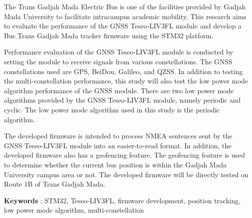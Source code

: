 The Trans Gadjah Mada Electric Bus is one of the facilities provided by Gadjah Mada University to facilitate intracampus academic mobility. This research aims to evaluate the performance of the GNSS Teseo-LIV3FL module and develop a Bus Trans Gadjah Mada tracker firmware using the STM32 platform.

Performance evaluation of the GNSS Teseo-LIV3FL module is conducted by setting the module to receive signals from various constellations. The GNSS constellations used are GPS, BeiDou, Galileo, and QZSS. In addition to testing the multi-constellation performance, this study will also test the low power mode algorithm performance of the GNSS module. There are two low power mode algorithms provided by the GNSS Teseo-LIV3FL module, namely periodic and cyclic. The low power mode algorithm used in this study is the periodic algorithm.

The developed firmware is intended to process NMEA sentences sent by the GNSS Teseo-LIV3FL module into an easier-to-read format. In addition, the developed firmware also has a geofencing feature. The geofencing feature is used to determine whether the current bus position is within the Gadjah Mada University campus area or not. The developed firmware will be directly tested on Route 1B of Trans Gadjah Mada.


\noindent\textbf{Keywords} : STM32, Teseo-LIV3FL, firmware development, position tracking, low power mode algorithm, multi-constellation